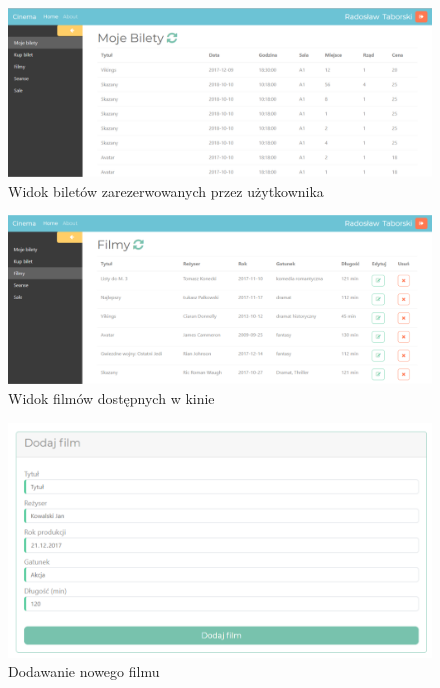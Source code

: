 \begin{figure} [H]
	\centering
	\includegraphics[width=1\linewidth]{rozdzial05/interfejs/mojeBilety.png}
	\caption{Widok biletów zarezerwowanych przez użytkownika}
	\label{fig:schem}
\end{figure}

\begin{figure} [H]
	\centering
	\includegraphics[width=1\linewidth]{rozdzial05/interfejs/filmy.png}
	\caption{Widok filmów dostępnych w kinie}
	\label{fig:schem}
\end{figure}

\begin{figure} [H]
	\centering
	\includegraphics[width=1\linewidth]{rozdzial05/interfejs/dadajFilm.png}
	\caption{Dodawanie nowego filmu}
	\label{fig:schem}
\end{figure}

